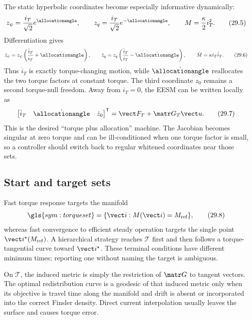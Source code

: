 The static hyperbolic coordinates become especially informative dynamically:
\[
 z_\psi=\frac{i_T}{\sqrt2}e^\allocationangle,\qquad
 z_q=\frac{i_T}{\sqrt2}e^{-\allocationangle},\qquad
 M=\frac{\kappa}{2}i_T^2.
 \tag{29.5}
\]
Differentiation gives
\[
 \dot z_\psi=z_\psi\left(\frac{\dot i_T}{i_T}+\dot{\allocationangle}\right),
 \qquad
 \dot z_q=z_q\left(\frac{\dot i_T}{i_T}-\dot{\allocationangle}\right),
 \qquad
 \dot M=\kappa i_T\dot i_T.
 \tag{29.6}
\]
Thus \(\dot i_T\) is exactly torque-changing motion, while \(\dot{\allocationangle}\)
reallocates the two torque factors at constant torque.  The third coordinate
\(z_0\) remains a second torque-null freedom.  Away from \(i_T=0\), the EESM
can be written locally as
\[
 \begin{bmatrix}\dot i_T&\dot{\allocationangle}&\dot z_0\end{bmatrix}^{\mathsf T}
 =\vect F_T+\matr G_T\vect u.
 \tag{29.7}
\]
This is the desired ``torque plus allocation'' machine.  The Jacobian becomes
singular at zero torque and can be ill-conditioned when one torque factor is
small, so a controller should switch back to regular whitened coordinates
near those sets.

\subsection{Start and target sets}

Fast torque response targets the manifold
\[
 \gls{sym:torqueset}=\{\vect i:M(\vect i)=M_{\mathrm{ref}}\},
 \tag{29.8}
\]
whereas fast convergence to efficient steady operation targets the single
point \(\vect i^\star(M_{\mathrm{ref}})\).  A hierarchical strategy reaches
\(\mathcal T\) first and then follows a torque-tangential curve toward
\(\vect i^\star\).  These terminal conditions have different minimum times;
reporting one without naming the target is ambiguous.

On \(\mathcal T\), the induced metric is simply the restriction of
\(\matr G\) to tangent vectors.  The optimal redistribution curve is a
geodesic of that induced metric only when its objective is travel time along
the manifold and drift is absent or incorporated into the correct Finsler
density.  Direct current interpolation usually leaves the surface and causes
torque error.

